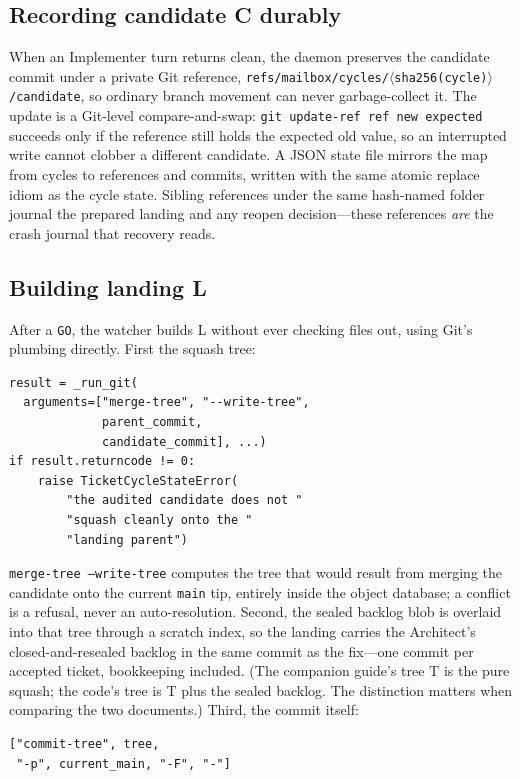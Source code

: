 \documentclass[10pt,aps,prd,twocolumn,nofootinbib]{revtex4-2}
\newcommand{\code}[1]{\texttt{#1}}
\begin{document}
\subsection{Recording candidate C durably}

When an Implementer turn returns clean, the daemon preserves the
candidate commit under a private Git reference,
\code{refs/mailbox/cycles/$\langle$sha256(cycle)$\rangle$/candidate},
so ordinary branch movement can never garbage-collect it.  The update
is a Git-level compare-and-swap: \code{git update-ref ref new
expected} succeeds only if the reference still holds the expected old
value, so an interrupted write cannot clobber a different candidate.
A JSON state file mirrors the map from cycles to references and
commits, written with the same atomic replace idiom as the cycle
state.  Sibling references under the same hash-named folder journal
the prepared landing and any reopen decision---these references
\emph{are} the crash journal that recovery reads.

\subsection{Building landing L}

After a \code{GO}, the watcher builds L without ever checking files
out, using Git's plumbing directly.  First the squash tree:

\begin{verbatim}
result = _run_git(
  arguments=["merge-tree", "--write-tree",
             parent_commit,
             candidate_commit], ...)
if result.returncode != 0:
    raise TicketCycleStateError(
        "the audited candidate does not "
        "squash cleanly onto the "
        "landing parent")
\end{verbatim}

\code{merge-tree --write-tree} computes the tree that would result
from merging the candidate onto the current \code{main} tip, entirely
inside the object database; a conflict is a refusal, never an
auto-resolution.  Second, the sealed backlog blob is overlaid into
that tree through a scratch index, so the landing carries the
Architect's closed-and-resealed backlog in the same commit as the
fix---one commit per accepted ticket, bookkeeping included.  (The
companion guide's tree T is the pure squash; the code's tree is T plus
the sealed backlog.  The distinction matters when comparing the two
documents.)  Third, the commit itself:

\begin{verbatim}
["commit-tree", tree,
 "-p", current_main, "-F", "-"]
\end{verbatim}
\end{document}
